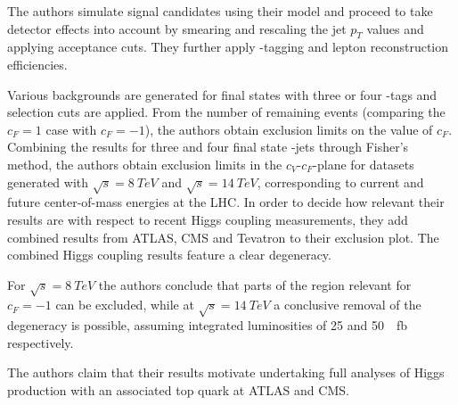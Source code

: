 The authors simulate signal candidates using their model and proceed to take detector effects into account by smearing and rescaling the jet $p_T$ values and applying acceptance cuts.
They further apply \Pqb-tagging and lepton reconstruction efficiencies.

Various backgrounds are generated for final states with three or four \Pqb-tags and selection cuts are applied.
From the number of remaining events (comparing the $c_F=1$ case with $c_F=-1$), the authors obtain exclusion limits on the value of $c_F$.
Combining the results for three and four final state \Pqb-jets through Fisher's method, the authors obtain exclusion limits in the $c_V$-$c_F$-plane for datasets generated with $\sqrt{s}=\SI{8}{TeV}$ and $\sqrt{s}=\SI{14}{TeV}$, corresponding to current and future center-of-mass energies at the LHC.
In order to decide how relevant their results are with respect to recent Higgs coupling measurements, they add combined results from ATLAS, CMS and Tevatron \cite{espinosa} to their exclusion plot.
The combined Higgs coupling results feature a clear degeneracy.

For $\sqrt{s}=\SI{8}{TeV}$ the authors conclude that parts of the region relevant for $c_F=-1$ can be excluded, while at $\sqrt{s}=\SI{14}{TeV}$ a conclusive removal of the degeneracy is possible, assuming integrated luminosities of \num{25} and \SI{50}{\per\femto\barn} respectively.

The authors claim that their results motivate undertaking full analyses of Higgs production with an associated top quark at ATLAS and CMS.

